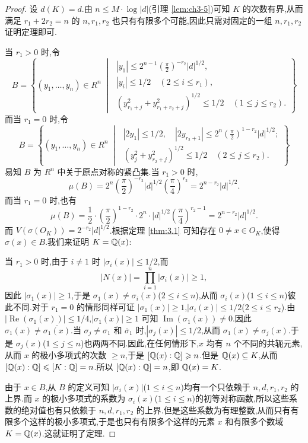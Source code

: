 \begin{proof}
设 $d(K)=d$.由 $n\leqslant M\cdot\log|d|$(引理 \ref{lem:ch3-5})可知 $K$ 的次数有界,从而满足 $r_1+2r_2=n$ 的 $n,r_1,r_2$ 也只有有限多个可能,因此只需对固定的一组 $n,r_1,r_2$ 证明定理即可.

当 $r_1>0$ 时,令
\[
  B=\left\{(y_1,\dots,y_n)\in R^n\;\middle|\;\begin{array}{l}
    |y_1|\leqslant 2^{n-1}\left(\frac{\pi}{2}\right)^{-r_2}|d|^{1/2},\\
    |y_i|\leqslant 1/2\quad (2\leqslant i\leqslant r_1),\\
    \left(y_{r_1+j}^2+y_{r_1+r_2+j}^2\right)^{1/2}\leqslant 1/2\quad (1\leqslant j\leqslant r_2).
  \end{array}\right\}
\]
而当 $r_1=0$ 时,令
\[
  B=\left\{(y_1,\dots,y_n)\in R^n\;\middle|\;\begin{array}{l}
    |2y_1|\leqslant 1/2,\quad |2y_{r_2+1}|\leqslant 2^n\left(\frac{\pi}{2}\right)^{1-r_2}|d|^{1/2};\\
    \left(y_j^2+y_{r_2+j}^2\right)^{1/2}\leqslant 1/2\quad (2\leqslant j\leqslant r_2).
  \end{array}\right\}
\]
易知 $B$ 为 $R^n$ 中关于原点对称的紧凸集.当 $r_1>0$ 时,
\[
  \mu(B)=2^n\left(\frac{\pi}{2}\right)^{-r_2}|d|^{1/2}\left(\frac{\pi}{4}\right)^{r_2}=2^{n-r_2}|d|^{1/2}.
\]
而当 $r_1=0$ 时,也有
\[
  \mu(B)=\frac{1}{2}\cdot\left(\frac{\pi}{2}\right)^{1-r_2}\cdot 2^n\cdot|d|^{1/2}\left(\frac{\pi}{4}\right)^{r_2-1}=2^{n-r_2}|d|^{1/2}.
\]
而 $V(\sigma(O_K))=2^{-r_2}|d|^{1/2}$.根据定理 \ref{thm:3.1} 可知存在 $0\neq x\in O_K$,使得 $\sigma(x)\in B$.我们来证明 $K=\mathbb{Q}(x)$:

当 $r_1>0$ 时,由于 $i\neq 1$ 时 $|\sigma_i(x)|\leqslant 1/2$,而
\[
  |N(x)|=\prod_{i=1}^{n}|\sigma_i(x)|\geqslant 1,
\]
因此 $|\sigma_1(x)|\geqslant 1$,于是 $\sigma_1(x)\neq\sigma_i(x)$($2\leqslant i\leqslant n$),从而 $\sigma_i(x)$($1\leqslant i\leqslant n$)彼此不同.对于 $r_1=0$ 的情形同样可证 $|\sigma_1(x)|\geqslant 1$,$|\sigma_i(x)|\leqslant 1/2$($2\leqslant i\leqslant r_2$).由 $|\operatorname{Re}(\sigma_1(x))|\leqslant 1/4$,$|\sigma_1(x)|\geqslant 1$ 可知 $\operatorname{Im}(\sigma_1(x))\neq 0$.因此 $\sigma_1(x)\neq\overline{\sigma_1(x)}$.当 $\sigma_j\neq\sigma_1$ 和 $\overline{\sigma}_1$ 时,$|\sigma_j(x)|\leqslant 1/2$,从而 $\sigma_1(x)\neq\sigma_j(x)$.于是 $\sigma_j(x)$($1\leqslant j\leqslant n$)也两两不同.因此,在任何情形下,$x$ 均有 $n$ 个不同的共轭元素,从而 $x$ 的极小多项式的次数 $\geqslant n$,于是 $[\mathbb{Q}(x):\mathbb{Q}]\geqslant n$.但是 $\mathbb{Q}(x)\subseteq K$,从而 $[\mathbb{Q}(x):\mathbb{Q}]\leqslant[K:\mathbb{Q}]=n$.所以 $[\mathbb{Q}(x):\mathbb{Q}]=n$,即 $\mathbb{Q}(x)=K$.

由于 $x\in B$,从 $B$ 的定义可知 $|\sigma_i(x)|$($1\leqslant i\leqslant n$)均有一个只依赖于 $n,d,r_1,r_2$ 的上界.而 $x$ 的极小多项式的系数为 $\sigma_i(x)$($1\leqslant i\leqslant n$)的初等对称函数,所以这些系数的绝对值也有只依赖于 $n,d,r_1,r_2$ 的上界.但是这些系数为有理整数,从而只有有限多个这样的极小多项式,于是也只有有限多个这样的元素 $x$ 和有限多个数域 $K=\mathbb{Q}(x)$.这就证明了定理.
\end{proof}

